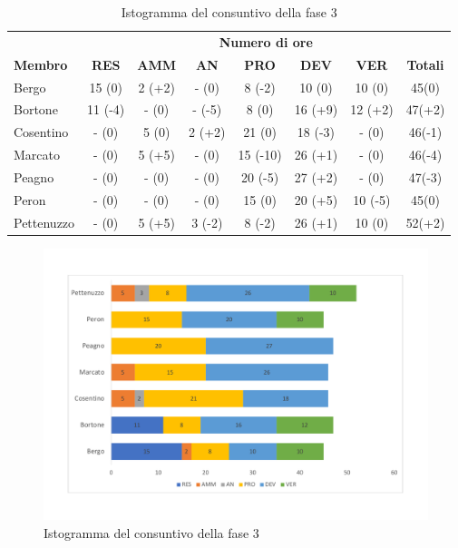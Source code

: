 	\begin{table}[H]
		\centering
		\begin{tabular}{| l | c c c c c c | c |}
			\rowcolor{LightBlue}
			& \multicolumn{7}{c}{\textbf{\color{white}Numero di ore}}	\\
			
			\rowcolor{LightBlue}
			\textbf{\color{white}Membro}
			& \textbf{\color{white}RES}
			& \textbf{\color{white}AMM}
			& \textbf{\color{white}AN}
			& \textbf{\color{white}PRO}
			& \textbf{\color{white}DEV}
			& \textbf{\color{white}VER}
			& \textbf{\color{white}Totali}\\
			Bergo     		& 15  (0) & 2 (+2) 	& -  (0) 		& 8 (-2) & 10 (0) & 10 (0) 	& 45(0)\\
			Bortone   		& 11  (-4) & -  (0) 	& -  (-5) 		& 8 (0) & 16 (+9) & 12 (+2)	& 47(+2)\\
			Cosentino & - (0) & 5 (0) 	& 2 (+2) & 21 (0) & 18 (-3) & - (0)	& 46(-1)\\
			Marcato  & -  (0) & 5 (+5) 	& -  (0) & 15 (-10) & 26 (+1) & - (0) & 46(-4)\\
			Peagno    		& -  (0) & - (0) & -  (0) & 20 (-5) & 27 (+2) & - (0)	& 47(-3)\\
			Peron   & -  (0) & -  (0) 	& -  (0) & 15 (0) & 20 (+5) &  10 (-5)	& 45(0)\\
			Pettenuzzo 		& - (0) & 5 (+5) & 3 (-2) & 8 (-2) & 26 (+1) & 10 (0)	& 52(+2)\\ \hline
		\end{tabular}
		\caption{Ore di lavoro impiegate per membro/ruolo della fase 3}
		
		\begin{figure}[H]
			\centering
			\includegraphics[scale=0.45]{images/consuntivoRQ.pdf}
			\caption{Istogramma del consuntivo della fase 3}
		\end{figure}
		
		
	\end{table}
